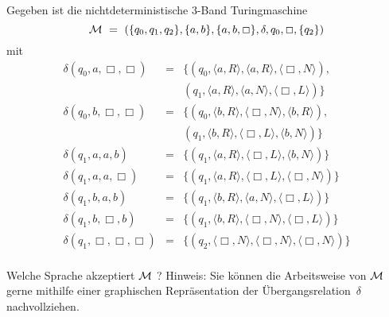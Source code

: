 \begin{exercise}

Gegeben ist die nichtdeterministische $3$-Band Turingmaschine
 $$\T \ = \ (\{q_0,q_1,q_2\}, \{a,b\}, \{a,b,\Box\}, \delta,q_0,
\Box,\{q_2\})
$$
mit
$$\begin{array}{lcl}
  \delta(q_0, a,\Box,\Box) & = & \{ (q_0, \langle a,R\rangle, \langle  a,R
  \rangle ,\langle  \Box,N  \rangle ), \\
  &  &  (q_1, \langle a,R\rangle, \langle  a,N
  \rangle ,\langle  \Box,L  \rangle )   \} \\
  
  \delta(q_0, b,\Box,\Box) & = & \{ (q_0, \langle b,R\rangle, \langle  \Box,N
  \rangle ,\langle  b,R  \rangle ), \\
  &  &  (q_1, \langle b,R\rangle, \langle  \Box,L
  \rangle ,\langle  b,N  \rangle )    \} \\

  \delta(q_1, a,a,b) & = & \{ (q_1, \langle a,R\rangle, \langle  \Box,L
  \rangle ,\langle  b,N  \rangle )    \} \\

  \delta(q_1, a,a,\Box) & = & \{ (q_1, \langle a,R\rangle, \langle  \Box,L
  \rangle ,\langle  \Box,N  \rangle )    \} \\

  \delta(q_1, b,a,b) & = & \{ (q_1, \langle b,R\rangle, \langle  a,N
  \rangle ,\langle  \Box,L  \rangle )    \} \\

  \delta(q_1, b,\Box,b) & = & \{ (q_1, \langle b,R\rangle, \langle  \Box,N
  \rangle ,\langle  \Box,L  \rangle )    \} \\

  \delta(q_1, \Box,\Box,\Box) & = & \{ (q_2, \langle \Box,N\rangle, \langle  \Box,N
  \rangle ,\langle  \Box,N  \rangle )    \} \\

\end{array}
$$

Welche Sprache akzeptiert $\mathcal{M}$ ? 
Hinweis: Sie können die Arbeitsweise von
$\mathcal{M}$ gerne mithilfe einer graphischen 
Repräsentation der Übergangsrelation~$\delta$ 
nachvollziehen.

\end{exercise}
